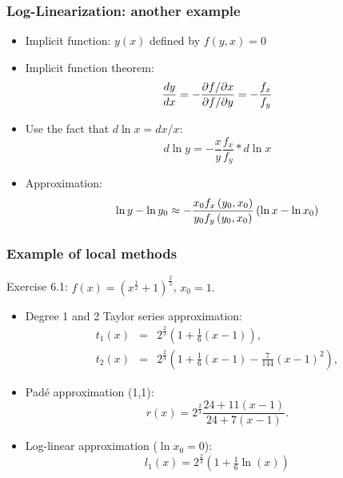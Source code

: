 \documentclass[bigger]{beamer}
\begin{document}
\begin{frame}%
\frametitle{Log-Linearization: another example}

\begin{itemize}
\item Implicit function: $y\left( x\right) $ defined by $f(y,x)=0$

\item Implicit function theorem:%
\begin{equation*}
\frac{dy}{dx}=-\frac{\partial f/\partial x}{\partial f/\partial y}=-\frac{%
f_{x}}{f_{y}}
\end{equation*}

\item Use the fact that $d\ln x=dx/x$:%
\begin{equation*}
d\ln y=-\frac{x}{y}\frac{f_{x}}{f_{y}}\ast d\ln x
\end{equation*}

\item Approximation:%
\begin{equation*}
\ln y-\ln y_{0}\approx -\frac{x_{0}f_{x}\left( y_{0},x_{0}\right) }{%
y_{0}f_{y}\left( y_{0},x_{0}\right) }\left( \ln x-\ln x_{0}\right)
\end{equation*}
\end{itemize}

\end{frame}%
\begin{frame}%
\frametitle{Example of local methods}

Exercise 6.1: $f(x)=\left( x^{\frac{1}{2}}+1\right) ^{\frac{2}{3}}$, $%
x_{0}=1.$

\begin{itemize}
\item Degree 1 and 2 Taylor series approximation: 
\begin{eqnarray*}
t_{1}(x) &=&{2}^{{\frac{2}{3}}}\left( 1+\tfrac{1}{6}\left( x-1\right)
\right) , \\
t_{2}(x) &=&{2}^{{\frac{2}{3}}}\left( 1+\tfrac{1}{6}\left( x-1\right) -%
\tfrac{7}{144}\left( x-1\right) ^{2}\right) ,
\end{eqnarray*}

\item Pad\'{e} approximation (1,1): 
\begin{equation*}
r(x)={2}^{{\frac{2}{3}}}{\frac{24+11\left( x-1\right) }{24+7(x-1)}}.
\end{equation*}

\item Log-linear approximation ($\ln x_{0}=0$): 
\begin{equation*}
l_{1}(x)={2}^{{\frac{2}{3}}}\left( 1+\tfrac{1}{6}\ln (x)\right)
\end{equation*}
\end{itemize}

\end{frame}%
\end{document}
